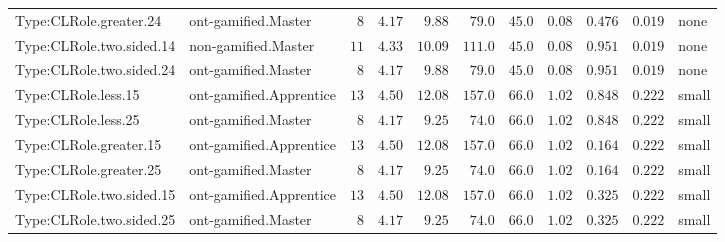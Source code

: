 \documentclass[6pt,a4paper]{article}
\begin{document}
{\begin{longtable}{llrrrrrrrrl}
Type:CLRole.greater.24&ont-gamified.Master&$ 8$&$4.17$&$ 9.88$&$ 79.0$&$ 45.0$&$ 0.08$&$0.476$&$0.019$&none\tabularnewline
Type:CLRole.two.sided.14&non-gamified.Master&$11$&$4.33$&$10.09$&$111.0$&$ 45.0$&$ 0.08$&$0.951$&$0.019$&none\tabularnewline
Type:CLRole.two.sided.24&ont-gamified.Master&$ 8$&$4.17$&$ 9.88$&$ 79.0$&$ 45.0$&$ 0.08$&$0.951$&$0.019$&none\tabularnewline
Type:CLRole.less.15&ont-gamified.Apprentice&$13$&$4.50$&$12.08$&$157.0$&$ 66.0$&$ 1.02$&$0.848$&$0.222$&small\tabularnewline
Type:CLRole.less.25&ont-gamified.Master&$ 8$&$4.17$&$ 9.25$&$ 74.0$&$ 66.0$&$ 1.02$&$0.848$&$0.222$&small\tabularnewline
Type:CLRole.greater.15&ont-gamified.Apprentice&$13$&$4.50$&$12.08$&$157.0$&$ 66.0$&$ 1.02$&$0.164$&$0.222$&small\tabularnewline
Type:CLRole.greater.25&ont-gamified.Master&$ 8$&$4.17$&$ 9.25$&$ 74.0$&$ 66.0$&$ 1.02$&$0.164$&$0.222$&small\tabularnewline
\newpage
Type:CLRole.two.sided.15&ont-gamified.Apprentice&$13$&$4.50$&$12.08$&$157.0$&$ 66.0$&$ 1.02$&$0.325$&$0.222$&small\tabularnewline
Type:CLRole.two.sided.25&ont-gamified.Master&$ 8$&$4.17$&$ 9.25$&$ 74.0$&$ 66.0$&$ 1.02$&$0.325$&$0.222$&small\tabularnewline
\hline
\end{longtable}}
\end{document}
